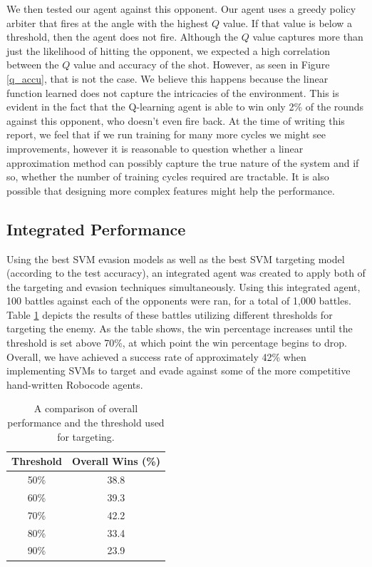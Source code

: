 \documentclass{article}
\theoremstyle{plain}
\theoremstyle{definition}
\theoremstyle{remark}
\begin{document}
We then tested our agent against this opponent. Our agent uses a greedy policy arbiter that fires at the angle with the highest $Q$ value. If that value is below a threshold, then the agent does not fire. Although the $Q$ value captures more than just the likelihood of hitting the opponent, we expected a high correlation between the $Q$ value and accuracy of the shot. However, as seen in Figure \ref{q_accu}, that is not the case. We believe this happens because the linear function learned does not capture the intricacies of the environment. This is evident in the fact that the Q-learning agent is able to win only 2\% of the rounds against this opponent, who doesn't even fire back. At the time of writing this report, we feel that if we run training for many more cycles we might see improvements, however it is reasonable to question whether a linear approximation method can possibly capture the true nature of the system and if so, whether the number of training cycles required are tractable. It is also possible that designing more complex features might help the performance.

\subsection*{Integrated Performance}
Using the best SVM evasion models as well as the best SVM targeting model (according to the test accuracy), an integrated agent was created to apply both of the targeting and evasion techniques simultaneously. Using this integrated agent, 100 battles against each of the opponents were ran, for a total of 1,000 battles. Table \ref{svm_thresh} depicts the results of these battles utilizing different thresholds for targeting the enemy. As the table shows, the win percentage increases until the threshold is set above 70\%, at which point the win percentage begins to drop. Overall, we have achieved a success rate of approximately 42\% when implementing SVMs to target and evade against some of the more competitive hand-written Robocode agents. 

\begin{table}[h]
\centering
    \begin{tabular}{|c|c|}
        \hline
        \bf{Threshold} & \bf{Overall Wins (\%) }\\ \hline
        50\%      & 38.8   \\ \hline
        60\%      & 39.3   \\ \hline
        70\%      & 42.2   \\ \hline
        80\%      & 33.4   \\ \hline
        90\%      & 23.9   \\
        \hline
    \end{tabular}
\label{svm_thresh}
\caption{A comparison of overall performance and the threshold used for targeting.}
\end{table}
\end{document}
